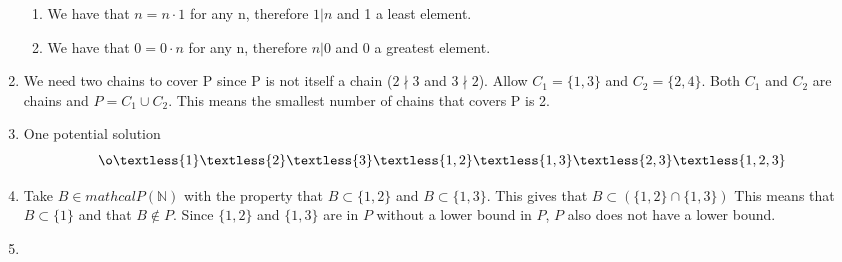 \documentclass{article}
\begin{document}
\begin{enumerate}
\begin{enumerate}[label=\arabic*)]
                \item We have that $ n = n \cdot 1$ for any n, therefore $1|n$ and 1 a least element.
                \item We have that $ 0 = 0 \cdot n$ for any n, therefore $n|0$ and 0 a greatest element.
            \end{enumerate}
        \item We need two chains to cover P since P is not itself a chain ($2\nmid 3$ and $3\nmid 2$). Allow $C_1 = \{1,3\}$ and $C_2 = \{2,4\}$. Both $C_1$ and $C_2$ are chains and $P=C_1\cup C_2$. This means the smallest number of chains that covers P is 2. 
        \item One potential solution
        $$\o \textless \{1\}\textless \{2\}\textless \{3\}\textless \{1,2\}\textless \{1,3\}\textless \{2,3\}\textless \{1,2,3\} $$
        \item Take $B \in mathcal{P}(\mathds{N})$ with the property that $B \subset \{1,2\}$ and $B \subset \{1,3\}$. This gives that $B \subset (\{1,2\} \cap \{1,3\})$ This means that $B \subset \{1\}$ and that $B \notin P$. Since $\{1,2\}$ and $\{1,3\}$ are in $P$ without a lower bound in $P$, $P$ also does not have a lower bound. 
        \item 
    \end{enumerate}
\end{document}
